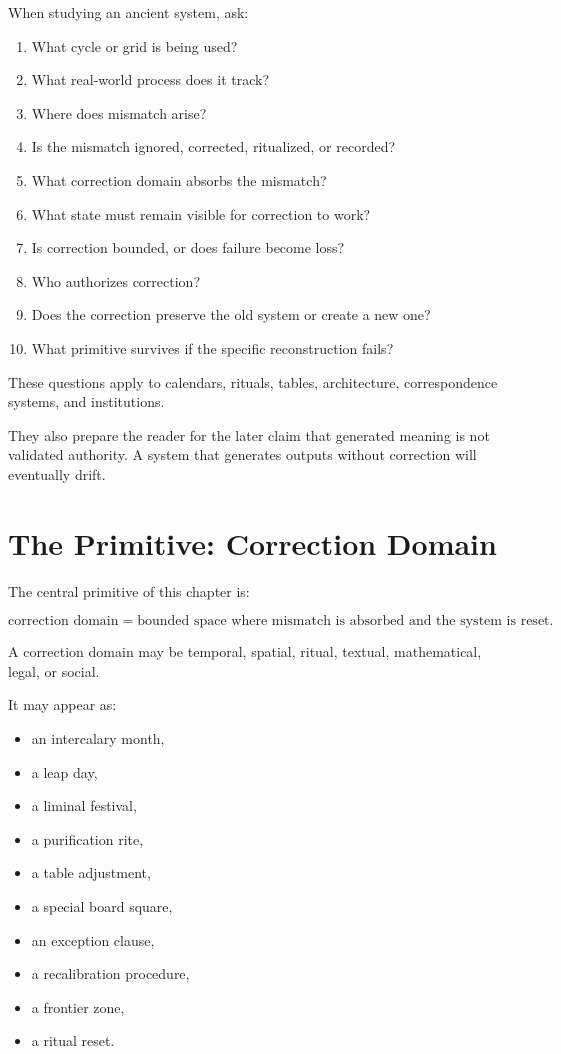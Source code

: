 \documentclass[11pt]{book}
\begin{document}
When studying an ancient system, ask:

\begin{enumerate}[label=\arabic*.]
    \item What cycle or grid is being used?
    \item What real-world process does it track?
    \item Where does mismatch arise?
    \item Is the mismatch ignored, corrected, ritualized, or recorded?
    \item What correction domain absorbs the mismatch?
    \item What state must remain visible for correction to work?
    \item Is correction bounded, or does failure become loss?
    \item Who authorizes correction?
    \item Does the correction preserve the old system or create a new one?
    \item What primitive survives if the specific reconstruction fails?
\end{enumerate}

These questions apply to calendars, rituals, tables, architecture, correspondence systems, and institutions.

They also prepare the reader for the later claim that generated meaning is not validated authority. A system that generates outputs without correction will eventually drift.

\section{The Primitive: Correction Domain}

The central primitive of this chapter is:

\[
\text{correction domain} = \text{bounded space where mismatch is absorbed and the system is reset}.
\]

A correction domain may be temporal, spatial, ritual, textual, mathematical, legal, or social.

It may appear as:

\begin{itemize}
    \item an intercalary month,
    \item a leap day,
    \item a liminal festival,
    \item a purification rite,
    \item a table adjustment,
    \item a special board square,
    \item an exception clause,
    \item a recalibration procedure,
    \item a frontier zone,
    \item a ritual reset.
\end{itemize}
\end{document}
